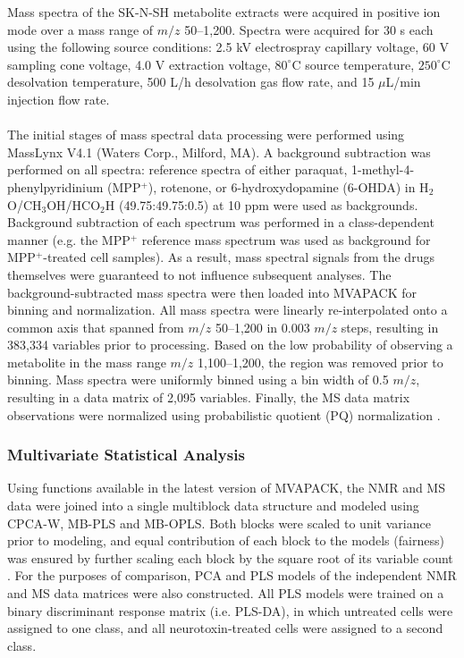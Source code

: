 \begin{doublespace}
Mass spectra of the SK-N-SH metabolite extracts were acquired in positive ion
mode over a mass range of $m/z$ 50--1,200. Spectra were acquired for 30 s each
using the following source conditions: 2.5 kV electrospray capillary voltage,
60 V sampling cone voltage, 4.0 V extraction voltage, $80^\circ$C source
temperature, $250^\circ$C desolvation temperature, 500 L/h desolvation gas
flow rate, and 15 $\mu$L/min injection flow rate.
\\\\
The initial stages of mass spectral data processing were performed using
MassLynx V4.1 (Waters Corp., Milford, MA). A background subtraction was
performed on all spectra: reference spectra of either paraquat,
1-methyl-4-phenylpyridinium (MPP$^+$), rotenone, or 6-hydroxydopamine (6-OHDA)
in H$_2$O/CH$_3$OH/HCO$_2$H (49.75:49.75:0.5) at 10 ppm were used as
backgrounds. Background subtraction of each spectrum was performed in a
class-dependent manner (e.g. the MPP$^+$ reference mass spectrum was used as
background for MPP$^+$-treated cell samples). As a result, mass spectral
signals from the drugs themselves were guaranteed to not influence subsequent
analyses. The background-subtracted mass spectra were then loaded into MVAPACK
for binning and normalization. All mass spectra were linearly re-interpolated
onto a common axis that spanned from $m/z$ 50--1,200 in 0.003 $m/z$ steps,
resulting in 383,334 variables prior to processing. Based on the low
probability of observing a metabolite in the mass range $m/z$ 1,100--1,200,
the region was removed prior to binning. Mass spectra were uniformly binned
using a bin width of 0.5 $m/z$, resulting in a data matrix of 2,095 variables.
Finally, the MS data matrix observations were normalized using probabilistic
quotient (PQ) normalization \cite{dieterle:anchem2006}.
\end{doublespace}

\subsubsection{Multivariate Statistical Analysis}

\begin{doublespace}
Using functions available in the latest version of MVAPACK, the NMR and MS
data were joined into a single multiblock data structure and modeled using
CPCA-W, MB-PLS and MB-OPLS. Both blocks were scaled to unit variance prior
to modeling, and equal contribution of each block to the models (fairness)
was ensured by further scaling each block by the square root of its variable
count \cite{smilde:jchemo2003}. For the purposes of comparison, PCA and PLS
models of the independent NMR and MS data matrices were also constructed.
All PLS models were trained on a binary discriminant response matrix
(i.e. PLS-DA), in which untreated cells were assigned to one class,
and all neurotoxin-treated cells were assigned to a second class.
\end{doublespace}

